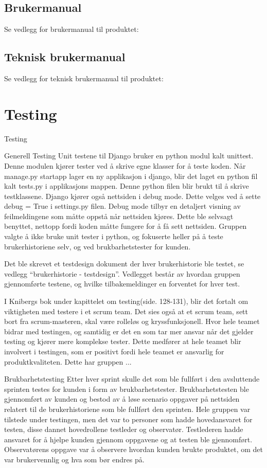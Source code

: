 \documentclass[12pt,a4paper,norsk]{article}
\begin{document}
	\subsection{Brukermanual}
	Se vedlegg for brukermanual til produktet:
	
	\subsection{Teknisk brukermanual}
	Se vedlegg for teknisk brukermanual til produktet: 
	
	\section{Testing}
	Testing

Generell Testing
Unit testene til Django bruker en python modul kalt unittest. Denne modulen kjører tester ved å skrive egne klasser for å teste koden. Når manage.py startapp lager en ny applikasjon i django, blir det laget en python fil kalt tests.py i applikasjons mappen. Denne python filen blir brukt til å skrive testklassene. Django kjører også nettsiden i debug mode. Dette velges ved å sette debug = True i settings.py filen. Debug mode tilbyr en detaljert visning av feilmeldingene som måtte oppstå når nettsiden kjøres. Dette ble selvsagt benyttet, nettopp fordi koden måtte fungere for å få sett nettsiden. Gruppen valgte å ikke bruke unit tester i python, og fokuserte heller på å teste brukerhistoriene selv, og ved brukbarhetstester for kunden.

Det ble skrevet et testdesign dokument der hver brukerhistorie ble testet, se vedlegg “brukerhistorie - testdesign”. Vedlegget består av hvordan gruppen gjennomførte testene, og hvilke tilbakemeldinger en forventet for hver test.

I Knibergs bok under kapittelet om testing(side. 128-131), blir det fortalt om viktigheten med testere i et scrum team. Det sies også at et scrum team, sett bort fra scrum-masteren, skal være rolleløs og kryssfunksjonell. Hvor hele teamet bidrar med testingen, og samtidig er det en som tar mer ansvar når det gjelder testing og kjører mere komplekse tester. Dette medfører at hele teamet blir involvert i testingen, som er positivt fordi hele teamet er ansvarlig for produktkvaliteten.
Dette har gruppen ...

Brukbarhetstesting
Etter hver sprint skulle det som ble fullført i den avsluttende sprinten testes for kunden i form av brukbarhetstester. Brukbarhetstesten ble gjennomført av kunden og bestod av å løse scenario oppgaver på nettsiden relatert til de brukerhistoriene som ble fullført den sprinten. Hele gruppen var tilstede under testingen, men det var to personer som hadde hovedansvaret for testen, disse dannet hovedrollene testleder og observatør. Testlederen hadde ansvaret for å hjelpe kunden gjennom oppgavene og at testen ble gjennomført. Observatørens oppgave var å observere hvordan kunden brukte produktet, om det var brukervennlig og hva som bør endres på.
\end{document}
